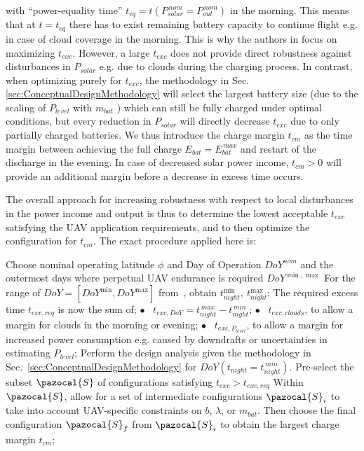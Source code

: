 with ``power-equality time'' $t_{eq}=t(P_{solar}^{\,nom}=P_{out}^{\,nom})$ in the morning. This means that at $t=t_{eq}$ there has to exist remaining battery capacity to continue flight e.g. in case of cloud coverage in the morning. This is why the authors in \cite{Noth_PhD,Leutenegger_JIRS} focus on maximizing $t_{exc}$. However, a large $t_{exc}$ does not provide direct robustness against disturbances in $P_{solar}$ e.g. due to clouds during the charging process. In contrast, when optimizing purely for $t_{exc}$, the methodology in Sec. \ref{sec:ConceptualDesignMethodology} will select the largest battery size (due to the scaling of $P_{level}$ with $m_{bat}$ ) which can still be fully charged under optimal conditions, but every reduction in $P_{solar}$ will directly decrease $t_{exc}$ due to only partially charged batteries. We thus introduce the charge margin $t_{cm}$ as the time margin between achieving the full charge $E_{bat}=E_{bat}^{\,max}$ and restart of the discharge in the evening. In case of decreased solar power income, $t_{cm}>0$ will provide an additional margin before a decrease in excess time occurs.

The overall approach for increasing robustness with respect to local disturbances in the power income and output is thus to determine the lowest acceptable $t_{exc}$ satisfying the UAV application requirements, and to then optimize the configuration for $t_{cm}$. The exact procedure applied here is:
\vspace{-3ex}
\begin{algorithm}[htp]
  \SetAlgoLined\DontPrintSemicolon
  \myproc{} %
  {
  \nl Choose nominal operating latitude $\phi$ and Day of Operation $DoY^{nom}$ and the outermost days where perpetual UAV endurance is required $DoY^{\min,\max}$ \;
  \nl For the range of $DoY=[DoY^{\min},DoY^{\max}]$ from~\cite{Duffie_SolarEngineering}, obtain $t_{night}^{\min},~t_{night}^{\max}$; \;
  \nl The required excess time $t_{exc,req}$ is now the sum of;  \; 
  \pushline
  \nonl \scriptsize$\bullet$\normalsize~  $t_{exc,DoY} = t_{night}^{\,max}-t_{night}^{\,min}$; \;
  \nonl \scriptsize$\bullet$\normalsize~  $t_{exc,clouds}$, to allow a margin for clouds in the morning or evening; \;
  \nonl \scriptsize$\bullet$\normalsize~  $t_{exc,P_{level}}$, to allow a margin for increased power consumption e.g. caused by downdrafts or uncertainties in estimating $P_{level}$; \;
  \popline \nl 
  \nl Perform the design analysis given the methodology in Sec.~\ref{sec:ConceptualDesignMethodology} for $DoY(t_{night}=t_{night}^{\,min})$. Pre-select the subset $\pazocal{S}$ of configurations satisfying $t_{exc}>t_{exc,req}$  \;
  \nl Within $\pazocal{S}$, allow for a set of intermediate configurations $\pazocal{S}_i$ to take into account UAV-specific constraints on $b$, $\lambda$, or $m_{bat}$. Then choose the final configuration $\pazocal{S}_f$  from $\pazocal{S}_i$ to obtain the largest charge margin $t_{cm}$; %
 }
\end{algorithm}

